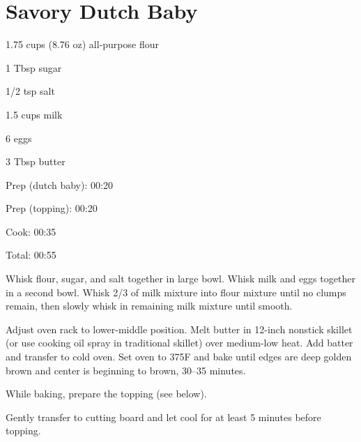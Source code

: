 \documentclass[oneside]{book}  %
\def\thisrecipe{}  %
\newcommand{\recipe}[1]{\section{#1}\def\thisrecipe{: #1}} %
\newcommand{\degF}{\textdegree F\xspace}
\begin{document}
\recipe{Savory Dutch Baby} \label{recipe:savory_dutch_baby} %
\begin{IT}[0.695]
  \begin{ingredients}[title=Dutch Baby Ingredients]
    \item[1.75 cups (8.76 oz)] all-purpose flour
    \item[1 Tbsp] sugar
    \item[1/2 tsp] salt
    \item[1.5 cups] milk
    \item[6] eggs
    \item[3 Tbsp] butter
  \end{ingredients}

  \switchcolumn

  \begin{timeline}
    \item[Prep (dutch baby):]  00:20
    \item[Prep (topping):]  00:20
    \item[Cook:]  00:35
    \item[Total:] 00:55
  \end{timeline}
\end{IT}

\begin{directions}
  \item Whisk flour, sugar, and salt together in large bowl. Whisk milk and eggs
  together in a second bowl. Whisk 2/3 of milk mixture into flour mixture until
  no clumps remain, then slowly whisk in remaining milk mixture until smooth.

  \item Adjust oven rack to lower-middle position. Melt butter in 12-inch
  nonstick skillet (or use cooking oil spray in traditional skillet) over
  medium-low heat. Add batter and transfer to cold oven. Set oven to 375\degF
  and bake until edges are deep golden brown and center is beginning to brown,
  30--35 minutes.

  \item While baking, prepare the topping (see below).

  \item Gently transfer to cutting board and let cool for at least 5 minutes
  before topping.
\end{directions}
\end{document}
